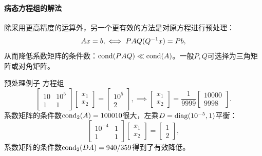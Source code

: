 \paragraph{病态方程组的解法}

除采用更高精度的运算外，另一个更有效的方法是对原方程进行预处理：
\[
    Ax=b,\iff PAQ(Q^{-1} x)=Pb,
\]
从而降低系数矩阵的条件数：$\operatorname{cond}(PAQ)\ll\operatorname{cond}(A)$。一般$P,Q$可选择为三角矩阵或对角矩阵。

\begin{example}
    {预处理例子}{}
    方程组
    \[
        \begin{bmatrix}
            10&10^5\\1&1
        \end{bmatrix}\begin{bmatrix}
            x_1\\x_2
        \end{bmatrix}=\begin{bmatrix}
            10^5\\2
        \end{bmatrix},\implies\begin{bmatrix}
            x_1\\x_2
        \end{bmatrix}=\frac1{9999}\begin{bmatrix}
            10000\\9998
        \end{bmatrix}.
    \]
    系数矩阵的条件数$\operatorname{cond}_2(A)=100010$很大，左乘$D=\operatorname{diag}(10^{-5},1)$平衡：
    \[
        \begin{bmatrix}
            10^{-4}&1\\1&1
        \end{bmatrix}\begin{bmatrix}
            x_1\\x_2
        \end{bmatrix}=\begin{bmatrix}
            1\\2
        \end{bmatrix},
    \]
    系数矩阵的条件数$\operatorname{cond}_2(DA)=940/359$得到了有效降低。
\end{example}
